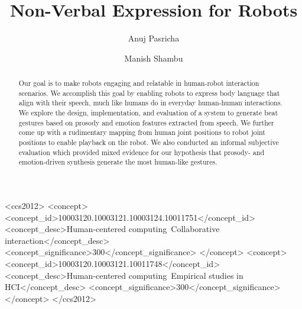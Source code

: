 \documentclass[sigconf]{acmart}
\begin{document}
\title{Non-Verbal Expression for Robots}

\author{Anuj Pasricha}

\author{Manish Shambu}

\renewcommand{\shortauthors}{A. Pasricha, M. Shambu}

\begin{abstract}
Our goal is to make robots engaging and relatable in human-robot interaction scenarios. We accomplish this goal by enabling robots to express body language that align with their speech, much like humans do in everyday human-human interactions. We explore the design, implementation, and evaluation of a system to generate beat gestures based on prosody and emotion features extracted from speech. We further come up with a rudimentary mapping from human joint positions to robot joint positions to enable playback on the robot. We also conducted an informal subjective evaluation which provided mixed evidence for our hypothesis that prosody- and emotion-driven synthesis generate the most human-like gestures.
\end{abstract}

%
%
\begin{CCSXML}
<ccs2012>
<concept>
<concept_id>10003120.10003121.10003124.10011751</concept_id>
<concept_desc>Human-centered computing~Collaborative interaction</concept_desc>
<concept_significance>300</concept_significance>
</concept>
<concept>
<concept_id>10003120.10003121.10011748</concept_id>
<concept_desc>Human-centered computing~Empirical studies in HCI</concept_desc>
<concept_significance>300</concept_significance>
</concept>
</ccs2012>
\end{CCSXML}


\maketitle





\end{document}
